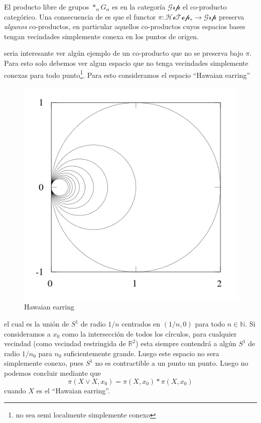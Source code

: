 El producto libre de grupos \(*_\alpha G_\alpha\) es en la categoría
\(\mathcal{Grp}\) el co-producto categórico. Una consecuencia
de \vank es que el functor \(\pi : \mathscr{HoTop}_* \to \mathscr{Grp}\)
preserva \emph{algunos} co-productos, en particular aquellos
co-productos cuyos espacios bases tengan vecindades simplemente conexa en los
puntos de origen.

seria interesante ver algún ejemplo de un co-producto que no se preserva
bajo \(\pi\). Para esto solo debemos ver algun espacio que no tenga
vecindades simplemente conexas para todo punto\footnote{no sea semi localmente
simplemente conexo}. Para esto consideramos el espacio ``Hawaian earring''
\begin{figure}[h]
  \centering
  \includegraphics[scale=0.3]{./imagenes/480px-Hawaiian_Earrings.svg.png}
  \caption*{Hawaian earring}
\end{figure}
el cual es la unión de \(S^1\) de radio \(1 / n\) centrados en
\((1/n, 0)\) para todo \(n \in \mathbb N\). Si consideramos a \(x_0\)
como la intersección de todos los círculos, para cualquier vecindad
(como vecindad restringida de \(\mathbb R ^2\)) esta siempre contendrá a
algún \(S^1\) de radio \(1 / {n_0}\) para \(n_0\) suficientemente
grande. Luego este espacio no sera simplemente conexo, pues \(S^1\) no
es contractible a un punto un punto. Luego no podemos concluir mediante
\vank que
\[ \pi (X \vee X , x_0) = \pi (X, x_0) * \pi (X, x_0)\]
cuando \(X\) es el ``Hawaian earring''.

